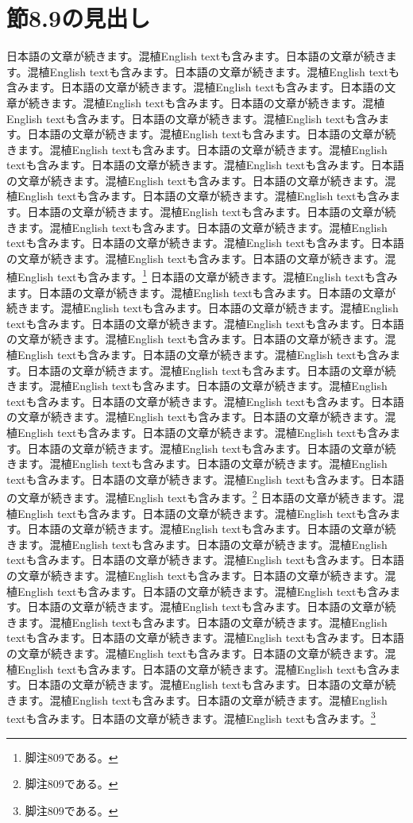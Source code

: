 \documentclass[pdflatex,book]{jlreq}
\begin{document}
\section{節8.9の見出し}
日本語の文章が続きます。混植English textも含みます。日本語の文章が続きます。混植English textも含みます。日本語の文章が続きます。混植English textも含みます。日本語の文章が続きます。混植English textも含みます。日本語の文章が続きます。混植English textも含みます。日本語の文章が続きます。混植English textも含みます。日本語の文章が続きます。混植English textも含みます。日本語の文章が続きます。混植English textも含みます。日本語の文章が続きます。混植English textも含みます。日本語の文章が続きます。混植English textも含みます。日本語の文章が続きます。混植English textも含みます。日本語の文章が続きます。混植English textも含みます。日本語の文章が続きます。混植English textも含みます。日本語の文章が続きます。混植English textも含みます。日本語の文章が続きます。混植English textも含みます。日本語の文章が続きます。混植English textも含みます。日本語の文章が続きます。混植English textも含みます。日本語の文章が続きます。混植English textも含みます。日本語の文章が続きます。混植English textも含みます。日本語の文章が続きます。混植English textも含みます。\footnote{脚注809である。}
日本語の文章が続きます。混植English textも含みます。日本語の文章が続きます。混植English textも含みます。日本語の文章が続きます。混植English textも含みます。日本語の文章が続きます。混植English textも含みます。日本語の文章が続きます。混植English textも含みます。日本語の文章が続きます。混植English textも含みます。日本語の文章が続きます。混植English textも含みます。日本語の文章が続きます。混植English textも含みます。日本語の文章が続きます。混植English textも含みます。日本語の文章が続きます。混植English textも含みます。日本語の文章が続きます。混植English textも含みます。日本語の文章が続きます。混植English textも含みます。日本語の文章が続きます。混植English textも含みます。日本語の文章が続きます。混植English textも含みます。日本語の文章が続きます。混植English textも含みます。日本語の文章が続きます。混植English textも含みます。日本語の文章が続きます。混植English textも含みます。日本語の文章が続きます。混植English textも含みます。日本語の文章が続きます。混植English textも含みます。日本語の文章が続きます。混植English textも含みます。\footnote{脚注809である。}
日本語の文章が続きます。混植English textも含みます。日本語の文章が続きます。混植English textも含みます。日本語の文章が続きます。混植English textも含みます。日本語の文章が続きます。混植English textも含みます。日本語の文章が続きます。混植English textも含みます。日本語の文章が続きます。混植English textも含みます。日本語の文章が続きます。混植English textも含みます。日本語の文章が続きます。混植English textも含みます。日本語の文章が続きます。混植English textも含みます。日本語の文章が続きます。混植English textも含みます。日本語の文章が続きます。混植English textも含みます。日本語の文章が続きます。混植English textも含みます。日本語の文章が続きます。混植English textも含みます。日本語の文章が続きます。混植English textも含みます。日本語の文章が続きます。混植English textも含みます。日本語の文章が続きます。混植English textも含みます。日本語の文章が続きます。混植English textも含みます。日本語の文章が続きます。混植English textも含みます。日本語の文章が続きます。混植English textも含みます。日本語の文章が続きます。混植English textも含みます。\footnote{脚注809である。}
\end{document}
